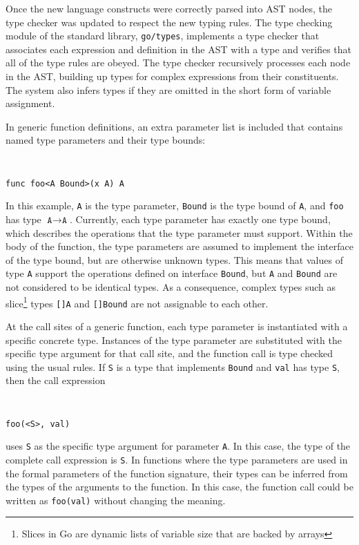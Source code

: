 \documentclass[letterpaper,11pt]{article}
\begin{document}
Once the new language constructs were correctly parsed into AST nodes, the type checker was updated to respect the new typing rules. The type checking module of the standard library, \texttt{go/types}, implements a type checker that associates each expression and definition in the AST with a type and verifies that all of the type rules are obeyed. The type checker recursively processes each node in the AST, building up types for complex expressions from their constituents. The system also infers types if they are omitted in the short form of variable assignment. 

In generic function definitions, an extra parameter list is included that contains named type parameters and their type bounds:

{ \tt \small
\begin{verbatim}
func foo<A Bound>(x A) A
\end{verbatim}
}

In this example, \texttt{A} is the type parameter, \texttt{Bound} is the type bound of \texttt{A}, and \texttt{foo} has type $\texttt{A} \rightarrow \texttt{A}$. Currently, each type parameter has exactly one type bound, which describes the operations that the type parameter must support. Within the body of the function, the type parameters are assumed to implement the interface of the type bound, but are otherwise unknown types. This means that values of type \texttt{A} support the operations defined on interface \texttt{Bound}, but \texttt{A} and \texttt{Bound} are not considered to be identical types. As a consequence, complex types such as slice\footnote{Slices in Go are dynamic lists of variable size that are backed by arrays} types \texttt{[]A} and \texttt{[]Bound} are not assignable to each other.

At the call sites of a generic function, each type parameter is instantiated with a specific concrete type. Instances of the type parameter are substituted with the specific type argument for that call site, and the function call is type checked using the usual rules. If \texttt{S} is a type that implements \texttt{Bound} and \texttt{val} has type \texttt{S}, then the call expression
{ \tt \small
\begin{verbatim}
foo(<S>, val)
\end{verbatim}
}
uses \texttt{S} as the specific type argument for parameter \texttt{A}. In this case, the type of the complete call expression is \texttt{S}. In functions where the type parameters are used in the formal parameters of the function signature, their types can be inferred from the types of the arguments to the function. In this case, the function call could be written as \texttt{foo(val)} without changing the meaning.
\end{document}
